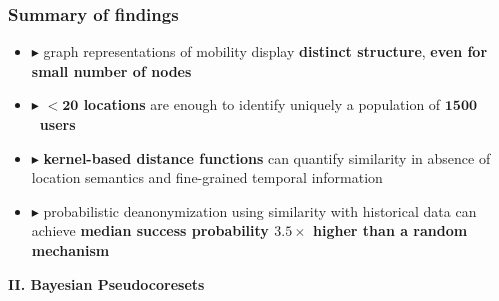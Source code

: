 \documentclass[hyperref={colorlinks = true},unknownkeysallowed]{beamer}
\begin{document}
\begin{frame}
	\frametitle{Summary of findings}
	\begin{block}{}%
		\begin{itemize}
			\item $\blacktriangleright$ graph representations of mobility display \textbf{distinct structure},
			\textbf{even for small number of nodes}
			\item  $\blacktriangleright$ \textbf{$ \mathbf{< 20}$ locations} are enough to identify uniquely a
			population of \mbox{\textbf{$ \mathbf{1500} $ users}}
			\item  $\blacktriangleright$ \textbf{kernel-based distance functions} can quantify similarity in absence
			of location semantics and fine-grained temporal information
			\item  $\blacktriangleright$ probabilistic deanonymization using similarity with historical
			data can achieve \textbf{median success probability $ \mathbf{3.5\times} $ higher
				than a random mechanism}
		\end{itemize}
		
	\end{block}
\end{frame}


\begin{frame}
	\LARGE{\textbf{II. Bayesian Pseudocoresets}}
\end{frame}
\end{document}
